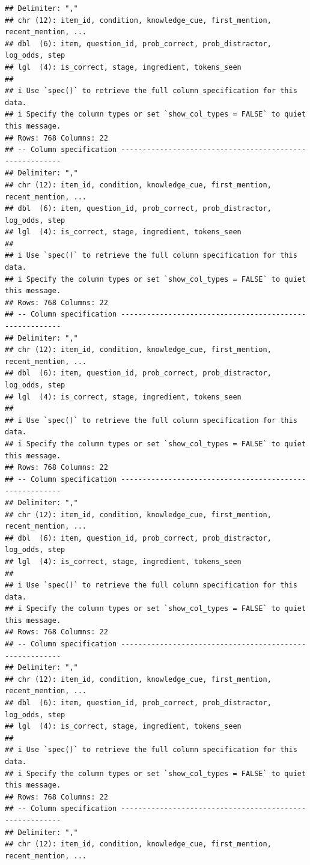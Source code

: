 \documentclass[
]{article}
\begin{document}
\begin{verbatim}
## Delimiter: ","
## chr (12): item_id, condition, knowledge_cue, first_mention, recent_mention, ...
## dbl  (6): item, question_id, prob_correct, prob_distractor, log_odds, step
## lgl  (4): is_correct, stage, ingredient, tokens_seen
## 
## i Use `spec()` to retrieve the full column specification for this data.
## i Specify the column types or set `show_col_types = FALSE` to quiet this message.
## Rows: 768 Columns: 22
## -- Column specification --------------------------------------------------------
## Delimiter: ","
## chr (12): item_id, condition, knowledge_cue, first_mention, recent_mention, ...
## dbl  (6): item, question_id, prob_correct, prob_distractor, log_odds, step
## lgl  (4): is_correct, stage, ingredient, tokens_seen
## 
## i Use `spec()` to retrieve the full column specification for this data.
## i Specify the column types or set `show_col_types = FALSE` to quiet this message.
## Rows: 768 Columns: 22
## -- Column specification --------------------------------------------------------
## Delimiter: ","
## chr (12): item_id, condition, knowledge_cue, first_mention, recent_mention, ...
## dbl  (6): item, question_id, prob_correct, prob_distractor, log_odds, step
## lgl  (4): is_correct, stage, ingredient, tokens_seen
## 
## i Use `spec()` to retrieve the full column specification for this data.
## i Specify the column types or set `show_col_types = FALSE` to quiet this message.
## Rows: 768 Columns: 22
## -- Column specification --------------------------------------------------------
## Delimiter: ","
## chr (12): item_id, condition, knowledge_cue, first_mention, recent_mention, ...
## dbl  (6): item, question_id, prob_correct, prob_distractor, log_odds, step
## lgl  (4): is_correct, stage, ingredient, tokens_seen
## 
## i Use `spec()` to retrieve the full column specification for this data.
## i Specify the column types or set `show_col_types = FALSE` to quiet this message.
## Rows: 768 Columns: 22
## -- Column specification --------------------------------------------------------
## Delimiter: ","
## chr (12): item_id, condition, knowledge_cue, first_mention, recent_mention, ...
## dbl  (6): item, question_id, prob_correct, prob_distractor, log_odds, step
## lgl  (4): is_correct, stage, ingredient, tokens_seen
## 
## i Use `spec()` to retrieve the full column specification for this data.
## i Specify the column types or set `show_col_types = FALSE` to quiet this message.
## Rows: 768 Columns: 22
## -- Column specification --------------------------------------------------------
## Delimiter: ","
## chr (12): item_id, condition, knowledge_cue, first_mention, recent_mention, ...

\end{verbatim}
\end{document}
